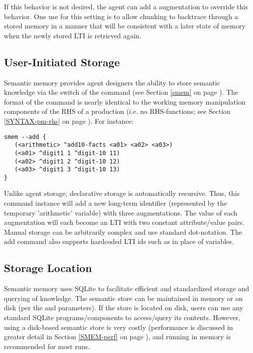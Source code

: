 If this behavior is not desired, the agent can add a  augmentation to override this behavior. One use for this setting is to allow chunking to backtrace through a stored memory in a manner that will be consistent with a later state of memory when the newly stored LTI is retrieved again.

\subsection{User-Initiated Storage}
Semantic memory provides agent designers the ability to store semantic knowledge via the  switch of the  command (see Section \ref{smem} on page \pageref{smem}).  
The format of the command is nearly identical to the working memory manipulation components of the RHS of a production (i.e. no RHS-functions; see Section \ref{SYNTAX-pm-rhs} on page \pageref{SYNTAX-pm-rhs}).  
For instance:

\begin{verbatim}
smem --add {
   (<arithmetic> ^add10-facts <a01> <a02> <a03>)
   (<a01> ^digit1 1 ^digit-10 11)
   (<a02> ^digit1 2 ^digit-10 12)
   (<a03> ^digit1 3 ^digit-10 13)
}
\end{verbatim}

Unlike agent storage, declarative storage is automatically recursive.  
Thus, this command instance will add a new long-term identifier (represented by the temporary 'arithmetic' variable) with three augmentations.  
The value of each augmentation will each become an LTI with two constant attribute/value pairs.  
Manual storage can be arbitrarily complex and use standard dot-notation.
The add command also supports hardcoded LTI ids such as  in place of variables.

\subsection{Storage Location}
Semantic memory uses SQLite to facilitate efficient and standardized storage and querying of knowledge.  
The semantic store can be maintained in memory or on disk (per the  and  parameters). 
If the store is located on disk, users can use any standard SQLite programs/components to access/query its contents.
However, using a disk-based semantic store is very costly (performance is discussed in greater detail in Section \ref{SMEM-perf} on page \pageref{SMEM-perf}), and running in memory is recommended for most runs.

